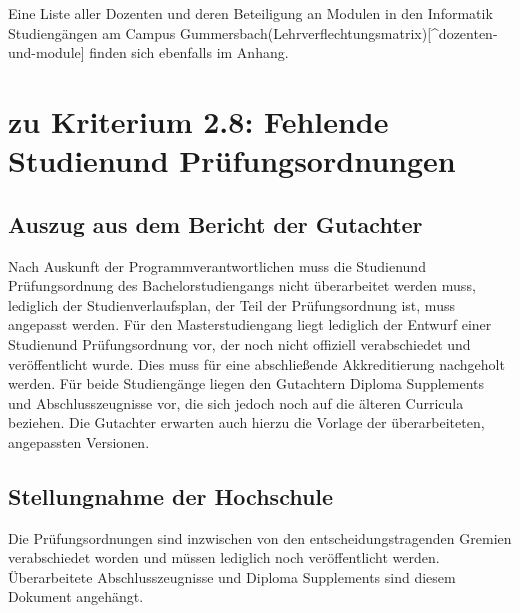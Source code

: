Eine Liste aller Dozenten und deren Beteiligung an Modulen in den
Informatik Studiengängen am Campus
Gummersbach(Lehrverflechtungsmatrix){[}\^{}dozenten-und-module{]} finden
sich ebenfalls im Anhang.

\section{zu Kriterium 2.8: Fehlende Studienund
Prüfungsordnungen\label{/mi-2017/selbstbericht/auflagen/0000-auflagen}}\label{zu-kriterium-2.8-fehlende-studienund-pruxfcfungsordnungenpathlabelmi-2017selbstberichtauflagen0000-auflagen}

\subsection{Auszug aus dem Bericht der
Gutachter\label{/mi-2017/selbstbericht/auflagen/0000-auflagen}}\label{auszug-aus-dem-bericht-der-gutachterpathlabelmi-2017selbstberichtauflagen0000-auflagen-6}

\begin{siderules}
Nach Auskunft der Programmverantwortlichen muss die Studienund
Prüfungsordnung des Bachelorstudiengangs nicht überarbeitet werden muss,
lediglich der Studienverlaufsplan, der Teil der Prüfungsordnung ist,
muss angepasst werden. Für den Masterstudiengang liegt lediglich der
Entwurf einer Studienund Prüfungsordnung vor, der noch nicht offiziell
verabschiedet und veröffentlicht wurde. Dies muss für eine abschließende
Akkreditierung nachgeholt werden. Für beide Studiengänge liegen den
Gutachtern Diploma Supplements und Abschlusszeugnisse vor, die sich
jedoch noch auf die älteren Curricula beziehen. Die Gutachter erwarten
auch hierzu die Vorlage der überarbeiteten, angepassten Versionen.
\end{siderules}

\subsection{Stellungnahme der
Hochschule\label{/mi-2017/selbstbericht/auflagen/0000-auflagen}}\label{stellungnahme-der-hochschulepathlabelmi-2017selbstberichtauflagen0000-auflagen-5}

Die Prüfungsordnungen sind inzwischen von den entscheidungstragenden
Gremien verabschiedet worden und müssen lediglich noch veröffentlicht
werden. Überarbeitete Abschlusszeugnisse und Diploma Supplements sind
diesem Dokument angehängt.
